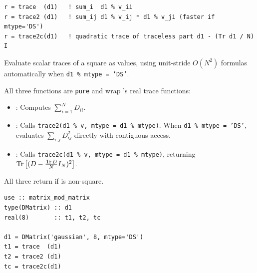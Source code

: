 

\lstset{language=[95]Fortran}
\begin{lstlisting}
r = trace  (d1)   ! sum_i  d1 % v_ii
r = trace2 (d1)   ! sum_ij d1 % v_ij * d1 % v_ji (faster if mtype='DS')
r = trace2c(d1)   ! quadratic trace of traceless part d1 - (Tr d1 / N) I
\end{lstlisting}

Evaluate scalar traces of a square   as  values, using unit-stride $O(N^2)$ formulas automatically when \texttt{d1 \% mtype = 'DS'}.

All three functions are \texttt{pure} and wrap 's real trace functions:
\begin{itemize}
  \item {}: Computes $\sum_{i=1}^N D_{ii}$.
  \item {}: Calls \texttt{trace2(d1 \% v, mtype = d1 \% mtype)}. When \texttt{d1 \% mtype = 'DS'}, evaluates $\sum_{i,j} D_{ij}^2$ directly with contiguous access.
  \item {}: Calls \texttt{trace2c(d1 \% v, mtype = d1 \% mtype)}, returning ${\rm Tr\,}\!\left[(D - \frac{{\rm Tr\,} D}{N} I_N)^2\right]$.
\end{itemize}
All three return  if  is non-square.

\begin{description}[leftmargin=2.2cm, style=nextline]
\end{description}

\lstset{language=[95]Fortran}
\begin{lstlisting}
use :: matrix_mod_matrix
type(DMatrix) :: d1
real(8)       :: t1, t2, tc

d1 = DMatrix('gaussian', 8, mtype='DS')
t1 = trace  (d1)
t2 = trace2 (d1)
tc = trace2c(d1)
\end{lstlisting}

